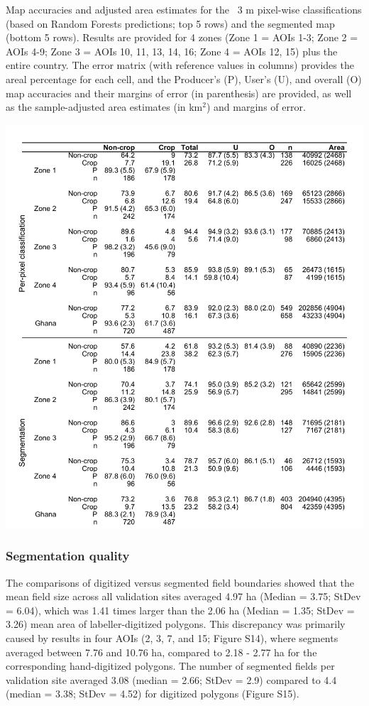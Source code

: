 \documentclass[11pt,a4paper]{article}
\begin{document}
\begin{table}
\caption{Map accuracies and adjusted area estimates for the ~3 m pixel-wise classifications (based on Random Forests predictions; top 5 rows) and the segmented map (bottom 5 rows). Results are provided for 4 zones (Zone 1 = AOIs 1-3; Zone 2 = AOIs 4-9; Zone 3 = AOIs 10, 11, 13, 14, 16; Zone 4 = AOIs 12, 15) plus the entire country. The error matrix (with reference values in columns) provides the areal percentage for each cell, and the Producer's (P), User's (U), and overall (O) map accuracies and their margins of error (in parenthesis) are provided, as well as the sample-adjusted area estimates (in km$^{2}$) and margins of error. }
\includegraphics[width = 18cm]{figures/table2.png}
\label{tab:mapaccuracy}
\end{table}

\hypertarget{segmentation-quality}{%
\subsubsection{Segmentation quality}\label{segmentation-quality}}

The comparisons of digitized versus segmented field boundaries showed
that the mean field size across all validation sites averaged 4.97 ha
(Median = 3.75; StDev = 6.04), which was 1.41 times larger than the 2.06
ha (Median = 1.35; StDev = 3.26) mean area of labeller-digitized
polygons. This discrepancy was primarily caused by results in four AOIs
(2, 3, 7, and 15; Figure S14), where segments averaged between 7.76 and
10.76 ha, compared to 2.18 - 2.77 ha for the corresponding
hand-digitized polygons. The number of segmented fields per validation
site averaged 3.08 (median = 2.66; StDev = 2.9) compared to 4.4 (median
= 3.38; StDev = 4.52) for digitized polygons (Figure S15).
\end{document}
